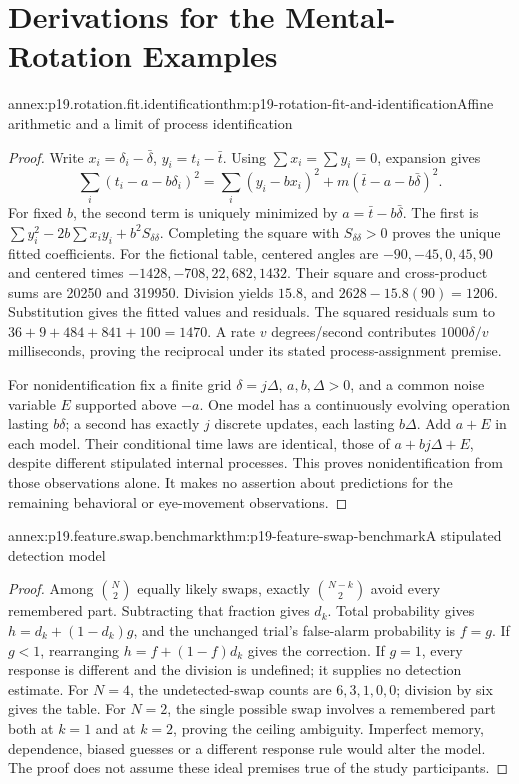 \chapter{Derivations for the Mental-Rotation Examples}
\label{annex:p19-mental-rotation}

\begin{annexitem}{annex:p19.rotation.fit.identification}{thm:p19-rotation-fit-and-identification}{Affine arithmetic and a limit of process identification}
\begin{proof}
Write \(x_i=\delta_i-\bar\delta\), \(y_i=t_i-\bar t\).
Using \(\sum x_i=\sum y_i=0\), expansion gives
\[
 \sum_i(t_i-a-b\delta_i)^2
 =\sum_i(y_i-bx_i)^2+
                  m(\bar t-a-b\bar\delta)^2.
\]
For fixed \(b\), the second term is uniquely minimized by
\(a=\bar t-b\bar\delta\). The first is
\(\sum y_i^2-2b\sum x_iy_i+b^2S_{\delta\delta}\).
Completing the square with \(S_{\delta\delta}>0\) proves
the unique fitted coefficients.
For the fictional table, centered angles are
\(-90,-45,0,45,90\) and centered times
\(-1428,-708,22,682,1432\).
Their square and cross-product sums are 20250 and 319950.
Division yields \(15.8\), and \(2628-15.8(90)=1206\).
Substitution gives the fitted values and residuals.
The squared residuals sum to \(36+9+484+841+100=1470\).
A rate \(v\) degrees/second contributes \(1000\delta/v\)
milliseconds, proving the reciprocal under its stated
process-assignment premise.

For nonidentification fix a finite grid \(\delta=j\Delta\),
\(a,b,\Delta>0\), and a common noise variable \(E\) supported
above \(-a\). One model has a continuously evolving operation
lasting \(b\delta\); a second has exactly \(j\) discrete updates,
each lasting \(b\Delta\). Add \(a+E\) in each model.
Their conditional time laws are identical, those of
\(a+bj\Delta+E\), despite different stipulated internal processes.
This proves nonidentification from those observations alone.
It makes no assertion about predictions for the remaining
behavioral or eye-movement observations.
\end{proof}
\end{annexitem}

\begin{annexitem}{annex:p19.feature.swap.benchmark}{thm:p19-feature-swap-benchmark}{A stipulated detection model}
\begin{proof}
Among \(\binom N2\) equally likely swaps, exactly
\(\binom{N-k}{2}\) avoid every remembered part.
Subtracting that fraction gives \(d_k\).
Total probability gives \(h=d_k+(1-d_k)g\), and the unchanged
trial's false-alarm probability is \(f=g\).
If \(g<1\), rearranging \(h=f+(1-f)d_k\) gives the correction.
If \(g=1\), every response is different and the division is
undefined; it supplies no detection estimate.
For \(N=4\), the undetected-swap counts are \(6,3,1,0,0\);
division by six gives the table.
For \(N=2\), the single possible swap involves a remembered
part both at \(k=1\) and at \(k=2\), proving the ceiling ambiguity.
Imperfect memory, dependence, biased guesses or a different
response rule would alter the model. The proof does not
assume these ideal premises true of the study participants.
\end{proof}
\end{annexitem}
